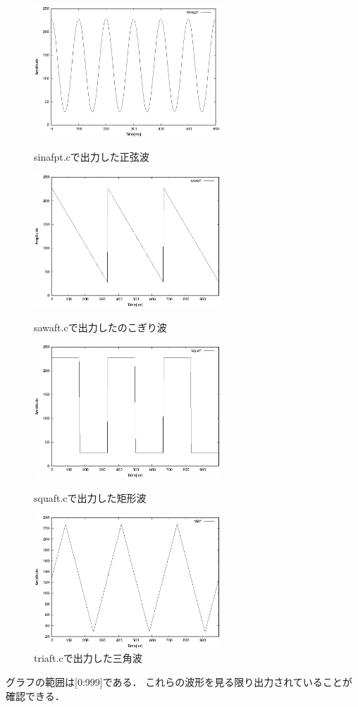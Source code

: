 \documentclass[titlepage]{jarticle}
\begin{document}
\begin{figure}[H]
  \begin{minipage}{0.495\hsize}
    \centering
    \includegraphics[width=7cm]{EPS/sinafpt.eps}
    \caption{sinafpt.cで出力した正弦波}
    \label{fig:sinafpt}
  \end{minipage}
  \begin{minipage}{0.495\hsize}
    \centering
    \includegraphics[width=7cm]{EPS/sawaft.eps}
    \caption{sawaft.cで出力したのこぎり波}
    \label{fig:sawaft}
  \end{minipage}
  \begin{minipage}{0.495\hsize}
    \centering
    \includegraphics[width=7cm]{EPS/squaft.eps}
    \caption{squaft.cで出力した矩形波}
    \label{fig:squaft}
  \end{minipage}
  \begin{minipage}{0.495\hsize}
    \centering
    \includegraphics[width=7cm]{EPS/triaft.eps}
    \caption{triaft.cで出力した三角波}
    \label{fig:triaft}
  \end{minipage}
\end{figure}
グラフの範囲は[0:999]である．
これらの波形を見る限り出力されていることが確認できる．
\end{document}
